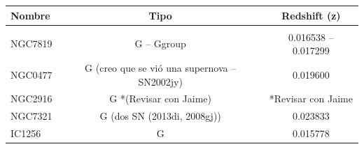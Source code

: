 \documentclass[9pt]{revtex4-1}
\begin{document}

\begin{center}
\begin{tabular}{ l c c }
Nombre & Tipo & Redshift (z) \\
\hline
\hline \\
NGC7819 & G -- Ggroup & 0.016538 -- 0.017299 \\
NGC0477 & G (creo que se vi\'o una supernova -- SN2002jy) & 0.019600 \\
NGC2916 & G *(Revisar con Jaime) & *Revisar con Jaime \\
NGC7321 & G (dos SN (2013di, 2008gj)) & 0.023833 \\
IC1256  & G & 0.015778 \\

\end{tabular}
\end{center}
\end{document}
